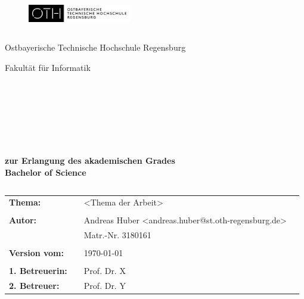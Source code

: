 \thispagestyle{empty}

\begin{figure}[t]
 \centering
 \includegraphics[width=0.4\textwidth]{assets/oth/logo}
\end{figure}

\begin{verbatim}
\end{verbatim}

\begin{center}
    \Large{Ostbayerische Technische Hochschule Regensburg}
\end{center}

\begin{center}
    \Large{Fakultät für Informatik}
\end{center}

\begin{verbatim}
\end{verbatim}

\begin{center}
    \doublespacing
    \textbf{\LARGE{\titleDocument}}\\

    \singlespacing

    \begin{verbatim}
    \end{verbatim}

    \textbf{{~\subjectDocument}}
\end{center}

\begin{verbatim}
\end{verbatim}

\begin{verbatim}
\end{verbatim}

\begin{center}
    \textbf{zur Erlangung des akademischen Grades \\ Bachelor of Science}
\end{center}

\begin{verbatim}
\end{verbatim}

\begin{flushleft}
    \begin{tabular}{llll}
        \textbf{Thema:} & & <Thema der Arbeit> & \\
        & & \\
        \textbf{Autor:} & & Andreas Huber <andreas.huber@st.oth-regensburg.de>& \\
        & & Matr.-Nr. 3180161 & \\
        & & \\
        \textbf{Version vom:} & & \today &\\
        & & \\
        \textbf{1. Betreuerin:} & & Prof. Dr. X &\\
        \textbf{2. Betreuer:} & & Prof. Dr. Y &\\
    \end{tabular}
\end{flushleft}